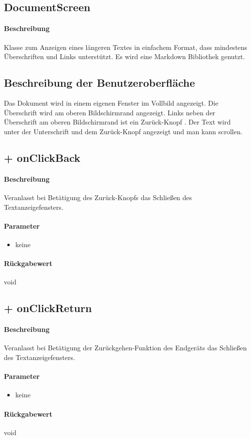 \subsection{DocumentScreen}
\paragraph*{Beschreibung}
Klasse zum Anzeigen eines längeren Textes in einfachem Format, 
dass mindestens Überschriften und Links unterstützt.
Es wird eine Markdown Bibliothek genutzt.

\subsection{Beschreibung der Benutzeroberfläche}
Das Dokument wird in einem eigenen Fenster im Vollbild angezeigt.
Die Überschrift wird am oberen Bildschirmrand angezeigt.
Links neben der Überschrift am oberen Bildschirmrand ist ein \dq Zurück-Knopf \dq{}.
Der Text wird unter der Unterschrift und dem \dq Zurück-Knopf \dq{} angezeigt und man kann scrollen.

\subsection{+ onClickBack}%
\paragraph*{Beschreibung}
Veranlasst bei Betätigung des \dq Zurück-Knopfs \dq{} das Schließen des Textanzeigefensters.
\paragraph*{Parameter}
\begin{itemize}
    \item keine
\end{itemize}
\paragraph*{Rückgabewert}
void

\subsection{+ onClickReturn}%
\paragraph*{Beschreibung}
Veranlasst bei Betätigung der Zurückgehen-Funktion des Endgeräts das Schließen des Textanzeigefensters.
\paragraph*{Parameter}
\begin{itemize}
    \item keine
\end{itemize}
\paragraph*{Rückgabewert}
void